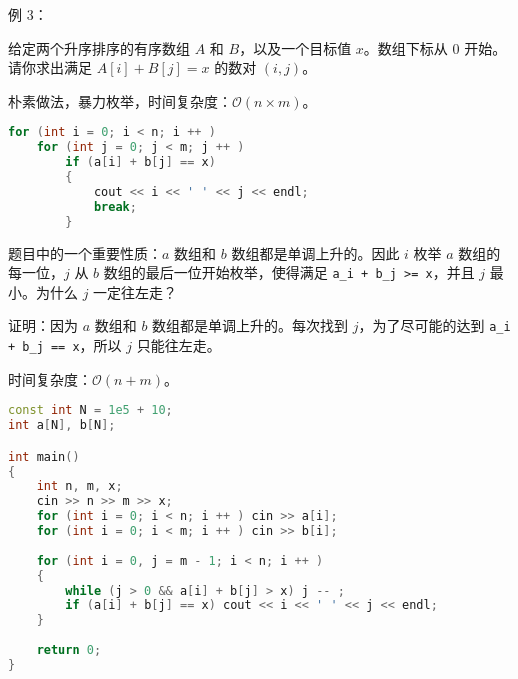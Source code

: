 例 $3$：

给定两个升序排序的有序数组 $A$ 和 $B$，以及一个目标值 $x$。数组下标从 $0$ 开始。请你求出满足 $A[i] + B[j] = x$ 的数对 $(i, j)$。

朴素做法，暴力枚举，时间复杂度：$\mathcal{O}(n \times m)$。

\begin{lstlisting}[language=cpp]
for (int i = 0; i < n; i ++ )   
    for (int j = 0; j < m; j ++ )
        if (a[i] + b[j] == x)
        {
            cout << i << ' ' << j << endl; 
            break;
        }
\end{lstlisting}

题目中的一个重要性质：$a$ 数组和 $b$ 数组都是单调上升的。因此 $i$ 枚举 $a$ 数组的每一位，$j$ 从 $b$ 数组的最后一位开始枚举，使得满足 \verb`a_i + b_j >= x`，并且 $j$ 最小。为什么 $j$ 一定往左走？

证明：因为 $a$ 数组和 $b$ 数组都是单调上升的。每次找到 $j$，为了尽可能的达到 \verb`a_i + b_j == x`，所以 $j$ 只能往左走。

时间复杂度：$\mathcal{O}(n + m)$。

\begin{lstlisting}[language=cpp]
const int N = 1e5 + 10;
int a[N], b[N];

int main()
{
    int n, m, x;
    cin >> n >> m >> x;
    for (int i = 0; i < n; i ++ ) cin >> a[i];
    for (int i = 0; i < m; i ++ ) cin >> b[i];
    
    for (int i = 0, j = m - 1; i < n; i ++ )
    {
        while (j > 0 && a[i] + b[j] > x) j -- ;
        if (a[i] + b[j] == x) cout << i << ' ' << j << endl;
    }
    
    return 0;
}
\end{lstlisting}
